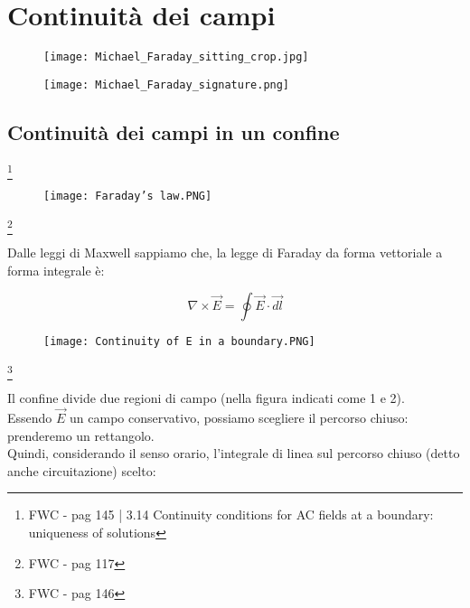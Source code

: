 \chapter{Continuità dei campi}

\begin{figure}[h]
    \centering
    \texttt{[image: Michael\_Faraday\_sitting\_crop.jpg]} 
\end{figure} 


\begin{figure}[h]
    \centering
    \texttt{[image: Michael\_Faraday\_signature.png]} 
\end{figure}  

\newpage 

\section{Continuità dei campi in un confine} 

\footnote{FWC - pag 145 | 3.14 Continuity conditions for AC fields at a boundary: uniqueness of solutions} 

\begin{figure}[h]
    \centering
    \texttt{[image: Faraday's law.PNG]} 
\end{figure}  

\footnote{FWC - pag 117} 

Dalle leggi di Maxwell sappiamo che, la legge di Faraday da forma vettoriale a forma integrale è: 

{
    \Large
    \begin{equation}
        \nabla \times \vec{E} = \oint \vec{E} \cdot \vec{dl}      
    \end{equation}
}

\begin{figure}[h]
    \centering 
    \texttt{[image: Continuity of E in a boundary.PNG]}
\end{figure} 

\footnote{FWC - pag 146} 

Il confine divide due regioni di campo (nella figura indicati come 1 e 2). \\ 

Essendo $\vec{E}$ un campo conservativo, possiamo scegliere il percorso chiuso: prenderemo un rettangolo. \\ 





Quindi, considerando il senso orario, l'integrale di linea sul percorso chiuso (detto anche circuitazione) scelto: \\ 

